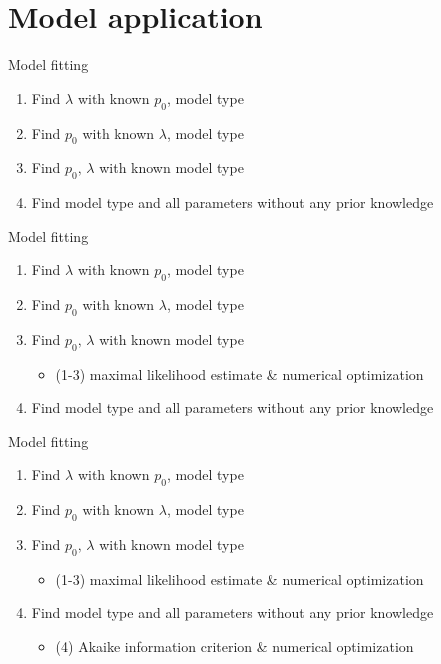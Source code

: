 \documentclass[american]{beamer}
\begin{document}
    \section{Model application}\label{sec:model-application}
    \begin{frame}{Model fitting}
        \begin{enumerate}
            \item Find $\lambda$ with known $p_{0}$, model type
            \item Find $p_{0}$ with known $\lambda$, model type
            \item Find $p_{0},\,\lambda$ with known model type
            \item Find model type and all parameters without any prior knowledge
        \end{enumerate}
    \end{frame}

    \begin{frame}{Model fitting}
        \begin{enumerate}
            \item Find $\lambda$ with known $p_{0}$, model type
            \item Find $p_{0}$ with known $\lambda$, model type
            \item Find $p_{0},\,\lambda$ with known model type
            \begin{itemize}
                \item (1-3) maximal likelihood estimate \& numerical optimization
            \end{itemize}
            \item Find model type and all parameters without any prior knowledge
        \end{enumerate}
    \end{frame}

    \begin{frame}{Model fitting}
        \begin{enumerate}
            \item Find $\lambda$ with known $p_{0}$, model type
            \item Find $p_{0}$ with known $\lambda$, model type
            \item Find $p_{0},\,\lambda$ with known model type
            \begin{itemize}
                \item (1-3) maximal likelihood estimate \& numerical optimization
            \end{itemize}
            \item Find model type and all parameters without any prior knowledge
            \begin{itemize}
                \item (4) Akaike information criterion \& numerical optimization
            \end{itemize}
        \end{enumerate}
    \end{frame}
\end{document}
